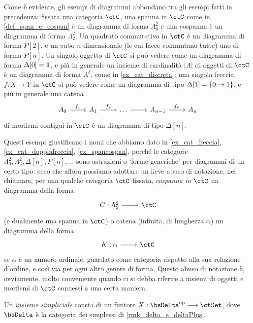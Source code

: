\begin{remark}\label{tante_cose_sono_diag}
	Come è evidente, gli esempi di diagrammi abbondano tra gli esempi fatti in precedenza: fissata una categoria \(\ctC\), una spanna in \(\ctC\) come in \ref{def_span_e_cospan} è un diagramma di forma \(\Lambda^2_0\) e una cospanna è un diagramma di forma \(\Lambda^2_2\). Un quadrato commutativo in \(\ctC\) è un diagramma di forma \(P[2]\), e un cubo \(n\)-dimensionale (le cui facce commutano tutte) uno di forma \(P[n]\). Un singolo oggetto di \(\ctC\) si può vedere come un diagramma di forma \(\Delta[0]=\mathbf{1}\), e più in generale un insieme di cardinalità \(|A|\) di oggetti di \(\ctC\) è un diagramma di forma \(A^\delta\), come in \ref{ex_cat_discreta}; una singola freccia \(f : X\to Y\) in \(\ctC\) si può vedere come un diagramma di tipo \(\Delta[1] = \{0\to 1\}\), e più in generale una catena
	\[\begin{tikzcd}
			A_0 \ar[r, "f_1"] & A_1 \ar[r, "f_2"] & \dots \ar[r] & A_{n-1} \ar[r, "f_n"] & A_n
		\end{tikzcd}
	\]
	di morfismi contigui in \(\ctC\) è un diagramma di tipo \(\Delta[n]\).

	Questi esempi giustificano i nomi che abbiamo dato in \ref{ex_cat_freccia}, \ref{ex_cat_doppiafreccia}, \ref{ex_spancospan}, perché le categorie \(\Lambda^2_0,\Lambda^2_2,\Delta[n], P[n], \dots\)  sono astrazioni o `forme generiche' per diagrammi di un certo tipo: ecco che allora possiamo adottare un lieve abuso di notazione, nel chiamare, per una qualche categoria \(\ctC\) fissata, \emph{cospanna in \(\ctC\)} un diagramma della forma
	\[\dmFun C{\Lambda^2_2}\ctC\]
	(e dualmente una spanna in \(\ctC\)) o catena (infinita, di lunghezza \(\alpha\)) un diagramma della forma
	\[\dmFun K\alpha\ctC\]
	se \(\alpha\) è un numero ordinale, guardato come categoria rispetto alla sua relazione d'ordine, e così via per ogni altro genere di forma. Questo abuso di notazione è, ovviamente, molto conveniente quando ci si debba riferire a insiemi di oggetti e morfismi di \(\ctC\) connessi a una certa maniera.
\end{remark}
\begin{definition}\label{def_insieme_simpliciale}
	Un \emph{insieme simpliciale} consta di un funtore \(X : \bsDelta^\op\fun\ctSet\), dove \(\bsDelta\) è la categoria dei simplessi di \ref{rmk_delta_e_deltaPlus}.
\end{definition}

